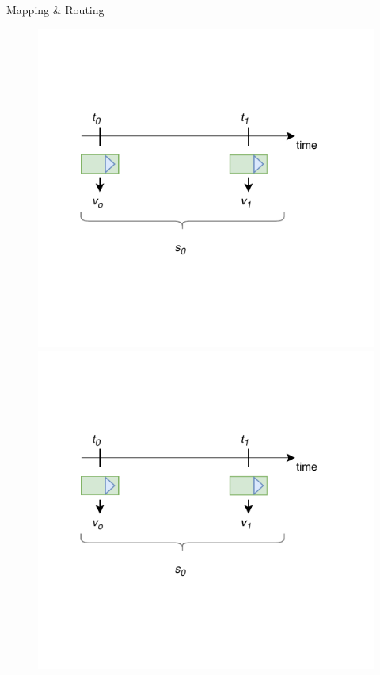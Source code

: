 \documentclass{beamer}
\begin{document}
\begin{frame}{Mapping \& Routing}
\centering
\begin{figure}
\begin{overprint}
	\includegraphics[page=13,scale=1]{sources/Rounting_1.pdf}
	\onslide<2>\includegraphics[page=14,scale=1]{sources/Rounting_1.pdf}

\end{overprint}
\end{figure}
\end{frame}
\end{document}
